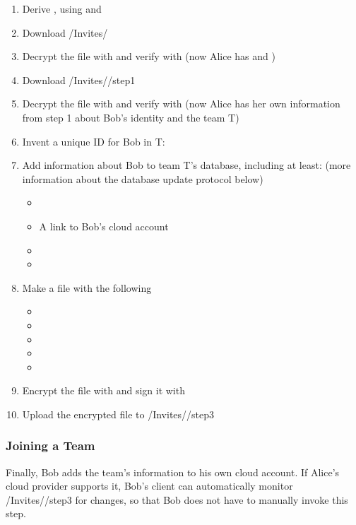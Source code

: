 \documentclass[pldi-cameraready,10pt]{sigplanconf-pldi16}
\begin{document}
\begin{enumerate}
\item Derive , using  and 
\item Download \slash Invites\slash {}
\item Decrypt the file with  and verify with  (now Alice has  and )
\item Download \slash Invites\slash {}\slash step1
\item Decrypt the file with  and verify with  (now Alice has her own information from step 1 about Bob's identity and the team T)
\item Invent a unique ID for Bob in T: 
\item Add information about Bob to team T's database, including at least: (more information about the database update protocol below)
  \begin{itemize}
  \item {}
  \item A link to Bob's cloud account
  \item {}
  \item {}
  \end{itemize}
\item Make a file with the following
  \begin{itemize}
  \item {}
  \item {}
  \item {}
  \item {}
  \item {}
  \end{itemize}
\item Encrypt the file with  and sign it with 
\item Upload the encrypted file to \slash Invites\slash {}\slash step3
\end{enumerate}

\subsubsection{Joining a Team}

Finally, Bob adds the team's information to his own cloud account.
If Alice's cloud provider supports it, Bob's client can automatically monitor \slash Invites\slash {}\slash step3 for changes, so that Bob does not have to manually invoke this step.
\end{document}
